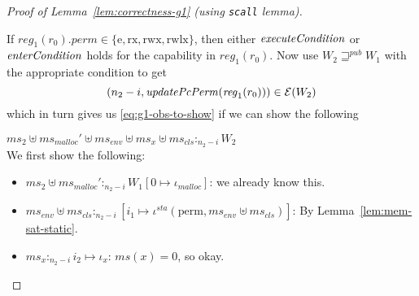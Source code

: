 \documentclass[a4paper]{article}
\newcommand{\update}[2]{[#1 \mapsto #2]}
\newcommand{\var}[1]{\mathit{#1}}
\newcommand{\hs}{\var{ms}}
\newcommand{\ms}{\hs}
\newcommand{\reg}{\var{reg}}
\newcommand{\heap}{\var{mem}}
\newcommand{\perm}{\var{perm}}
\newcommand{\sta}{\var{sta}}
\newcommand{\env}{\var{env}}
\newcommand{\cls}{\var{cls}}
\newcommand{\plainfun}[2]{
  \ifthenelse{\equal{#2}{}}
  {\mathit{#1}}
  {\mathit{#1}(#2)}
}
\newcommand{\updatePcPerm}[1]{\plainfun{updatePcPerm}{#1}}
\newcommand{\execCond}[1]{\plainfun{executeCondition}{#1}}
\newcommand{\entryCond}[1]{\plainfun{enterCondition}{#1}}
\newcommand{\futurewk}{\mathbin{\sqsupseteq}^{\var{pub}}}
\newcommand{\heapSat}[3][\heap]{#1 :_{#2} #3}
\newcommand{\memSat}[3][n]{\heapSat[#2]{#1}{#3}}
\newcommand{\codelabel}[1]{\mathit{#1}}
\newcommand{\malloc}{\codelabel{malloc}}
\newcommand{\asmType}{\plaindom{AsmType}}
\newcommand{\plaindom}[1]{\mathrm{#1}}
\newcommand{\intr}[2]{\mathcal{#1}}
\newcommand{\exprintr}[1]{\intr{E}{#1}}
\newcommand{\stder}{\exprintr{\asmType}}
\newcommand{\npair}[2][n]{\left(#1,#2 \right)}
\newcommand{\plainperm}[1]{\mathrm{#1}}
\newcommand{\exec}{\plainperm{rx}}
\newcommand{\entry}{\plainperm{e}}
\newcommand{\rwx}{\plainperm{rwx}}
\newcommand{\rwlx}{\plainperm{rwlx}}
\newcommand{\plainview}[1]{\mathrm{#1}}
\newcommand{\perma}{\plainview{perm}}
\begin{document}
\begin{proof}[Proof of Lemma~\ref{lem:correctness-g1} (using \texttt{scall} lemma)]
\begin{enumproof}[resume]
\begin{enumproof}
          If $\reg_1(r_0).\perm \in \{\entry, \exec, \rwx, \rwlx\}$, then either $\execCond{}$ or $\entryCond{}$ holds for the capability in $\reg_1(r_0)$. Now use $W_2 \futurewk W_1$ with the appropriate condition to get 
          \[
            \npair[n_2-i]{\updatePcPerm{\reg_1(r_0)}} \in \stder(W_2)
          \]
          which in turn gives us \ref{eq:g1-obs-to-show} if we can show the following
          \begin{enumproof}
            \item $\memSat[n_2-i]{\ms_2 \uplus \ms_\malloc' \uplus \ms_\env \uplus \ms_x \uplus \ms_\cls}{W_2}$\\
              We first show the following:
              \begin{itemize}
              \item $\memSat[n_2-i]{\ms_2 \uplus \ms_\malloc'}{W_1\update{0}{\iota_\malloc}}$: we already know this.
              \item $\memSat[n_2-i]{\ms_\env \uplus \ms_\cls}{[i_1 \mapsto \iota^\sta(\perma, \ms_\env \uplus \ms_\cls)]}$: By Lemma~\ref{lem:mem-sat-static}.
              \item $\memSat[n_2-i]{\ms_x}{i_2 \mapsto \iota_x}$: $\ms(x) = 0$, so okay.
              \end{itemize}


\end{enumproof}
\end{enumproof}
\end{enumproof}
\end{proof}
\end{document}
